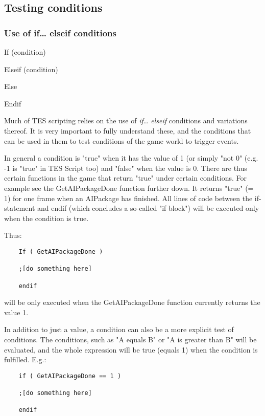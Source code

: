 \protect\hypertarget{_Toc182634504}{}{}

\hypertarget{testing-conditions}{%
\subsection{Testing conditions}\label{testing-conditions}}

\hypertarget{use-of-if-elseif-conditions}{%
\subsubsection{Use of if\ldots{} elseif
conditions}\label{use-of-if-elseif-conditions}}

	If (condition)
	
	Elseif (condition)
	
	Else
	
	Endif

Much of TES scripting relies on the use of \emph{if\ldots{} elseif}
conditions and variations thereof. It is very important to fully
understand these, and the conditions that can be used in them to test
conditions of the game world to trigger events.

In general a condition is "true" when it has the value of 1 (or simply
"not 0" (e.g. -1 is "true" in TES Script too) and "false" when the value
is 0. There are thus certain functions in the game that return "true"
under certain conditions. For example see the GetAIPackageDone function
further down. It returns "true" (= 1) for one frame when an AIPackage
has finished. All lines of code between the if-statement and endif
(which concludes a so-called "if block") will be executed only when the
condition is true.

Thus:

\begin{lstlisting}
	If ( GetAIPackageDone )
	
	;[do something here]
	
	endif
\end{lstlisting}

will be only executed when the GetAIPackageDone function currently
returns the value 1.

In addition to just a value, a condition can also be a more explicit
test of conditions. The conditions, such as "A equals B" or "A is
greater than B" will be evaluated, and the whole expression will be true
(equals 1) when the condition is fulfilled. E.g.:

\begin{lstlisting}
	if ( GetAIPackageDone == 1 )
	
	;[do something here]
	
	endif
\end{lstlisting}

